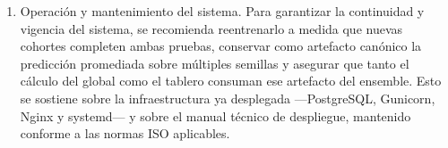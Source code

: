 \begin{enumerate}
	\item Operación y mantenimiento del sistema. Para garantizar la continuidad y vigencia del sistema, se recomienda reentrenarlo a medida que nuevas cohortes completen ambas pruebas, conservar como artefacto canónico la predicción promediada sobre múltiples semillas y asegurar que tanto el cálculo del global como el tablero consuman ese artefacto del ensemble. Esto se sostiene sobre la infraestructura ya desplegada —PostgreSQL, Gunicorn, Nginx y systemd— y sobre el manual técnico de despliegue, mantenido conforme a las normas ISO aplicables.
\end{enumerate}